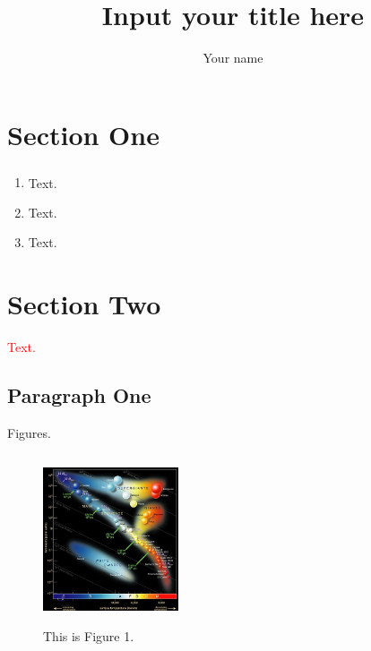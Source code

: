 \documentclass[11pt, a4paper]{article}
\title{{\Huge Input your title here}}
\author{Your name}
\numberwithin{equation}{section} %
\newcommand{\tcr}{\textcolor{blue}}
\newcommand{\upcite}[1]{\textsuperscript{\textsuperscript{\tcr{\cite{#1}}}}}
\begin{document}
\maketitle

\tableofcontents %
\newpage



\section{Section One}

	\begin{enumerate}
	\item Text\upcite{ref1}.

	\item Text\cite{ref1,ref2}.

	\item Text.
	\end{enumerate}

\section{Section Two}

	\textcolor{red}{Text.}

	\subsection{Paragraph One}

		Figures.

		\begin{figure}[h]
			\centering
			\label{fig1}
			\includegraphics[width=4cm,height=5cm]{2-1.png}
			\caption{This is Figure 1.}
		\end{figure}
\end{document}
